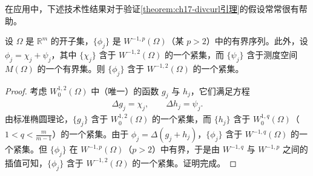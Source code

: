 \documentclass[../../main.tex]{subfiles}
\begin{document}
在应用中，下述技术性结果对于验证\cref{theorem:ch17-divcurl引理}的假设常常很有帮助。

\begin{lemma}\label{lemma:ch17-插值紧致引理}
设 $\Omega$ 是 $\mathbb{R}^m$ 的开子集，$\{\phi_j\}$ 是 $W^{-1,p}(\Omega)$（某 $p>2$）中的有界序列。此外，设 $\phi_j=\chi_j+\psi_j$，其中 $\{\chi_j\}$ 含于 $W^{-1,2}(\Omega)$ 的一个紧集，而 $\{\psi_j\}$ 含于测度空间 $M(\Omega)$ 的一个有界集。则 $\{\phi_j\}$ 含于 $W^{-1,2}(\Omega)$ 的一个紧集。
\end{lemma}

\begin{proof}
考虑 $W^{1,2}_0(\Omega)$ 中（唯一）的函数 $g_j$ 与 $h_j$，它们满足方程
\begin{align}
\Delta g_j=\chi_j,\qquad\Delta h_j=\psi_j.
\label{align:ch17-1725}
\end{align}
由标准椭圆理论，$\{g_j\}$ 含于 $W^{1,2}_0(\Omega)$ 的一个紧集，而 $\{h_j\}$ 含于 $W^{1,q}_0(\Omega)$（$1<q<\frac{m}{m-1}$）的一个紧集。由于 $\phi_j=\Delta(g_j+h_j)$，$\{\phi_j\}$ 含于 $W^{-1,q}(\Omega)$ 的一个紧集。但 $\{\phi_j\}$ 在 $W^{-1,p}(\Omega)$（$p>2$）中有界，于是由 $W^{-1,q}$ 与 $W^{-1,p}$ 之间的插值可知，$\{\phi_j\}$ 含于 $W^{-1,2}(\Omega)$ 的一个紧集。证明完成。
\end{proof}
\end{document}
